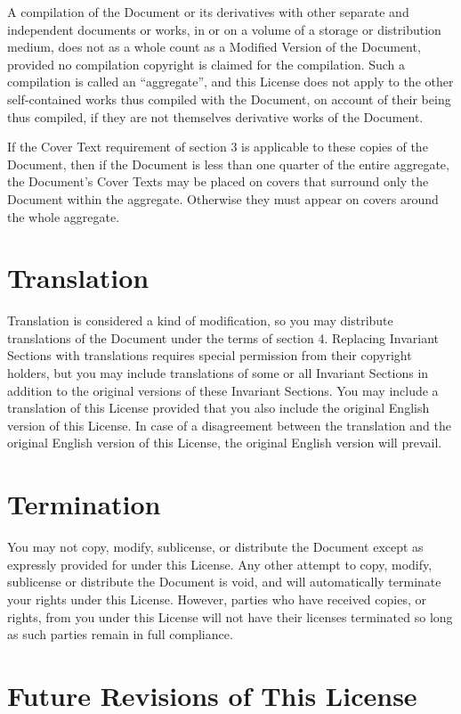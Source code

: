 A compilation of the Document or its derivatives with other separate
and independent documents or works, in or on a volume of a storage or
distribution medium, does not as a whole count as a Modified Version
of the Document, provided no compilation copyright is claimed for the
compilation.  Such a compilation is called an ``aggregate'', and this
License does not apply to the other self-contained works thus compiled
with the Document, on account of their being thus compiled, if they
are not themselves derivative works of the Document.

If the Cover Text requirement of section 3 is applicable to these
copies of the Document, then if the Document is less than one quarter
of the entire aggregate, the Document's Cover Texts may be placed on
covers that surround only the Document within the aggregate.
Otherwise they must appear on covers around the whole aggregate.


\section{Translation}

Translation is considered a kind of modification, so you may
distribute translations of the Document under the terms of section 4.
Replacing Invariant Sections with translations requires special
permission from their copyright holders, but you may include
translations of some or all Invariant Sections in addition to the
original versions of these Invariant Sections.  You may include a
translation of this License provided that you also include the
original English version of this License.  In case of a disagreement
between the translation and the original English version of this
License, the original English version will prevail.


\section{Termination}

You may not copy, modify, sublicense, or distribute the Document except
as expressly provided for under this License.  Any other attempt to
copy, modify, sublicense or distribute the Document is void, and will
automatically terminate your rights under this License.  However,
parties who have received copies, or rights, from you under this
License will not have their licenses terminated so long as such
parties remain in full compliance.


\section{Future Revisions of This License}

